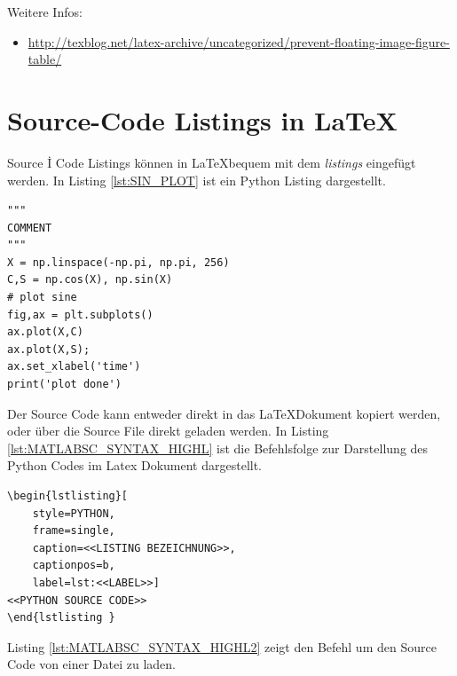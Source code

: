 \documentclass[SSS_Laborbericht.tex]{subfiles}
\begin{document}
Weitere Infos:
\begin{itemize}
  \item \href{http://texblog.net/latex-archive/uncategorized/prevent-floating-image-figure-table/}{http://texblog.net/latex-archive/uncategorized/prevent-floating-image-figure-table/}
\end{itemize}

\section{Source-Code Listings in \LaTeX}
Source \.I Code Listings können in \LaTeX bequem mit dem \textit{listings} eingefügt werden. In Listing \ref{lst:SIN_PLOT} ist ein Python Listing dargestellt.
\begin{lstlisting}[style=PYTHON, frame=single, caption=Sinus Plot, captionpos=b, label=lst:SIN_PLOT]
"""
COMMENT
"""
X = np.linspace(-np.pi, np.pi, 256)
C,S = np.cos(X), np.sin(X)
# plot sine
fig,ax = plt.subplots()
ax.plot(X,C)
ax.plot(X,S);
ax.set_xlabel('time')
print('plot done')
\end{lstlisting}
Der Source Code kann entweder direkt in das \LaTeX Dokument kopiert werden, oder über die Source File direkt geladen werden. In Listing \ref{lst:MATLABSC_SYNTAX_HIGHL} ist die Befehlsfolge zur Darstellung des Python Codes im Latex Dokument dargestellt. 
\begin{lstlisting}[style=LATEX, frame=single, caption=Latex Source Code Syntax Highlighting Prototyp, captionpos=b, label=lst:MATLABSC_SYNTAX_HIGHL, numbers=none]
\begin{lstlisting}[
	style=PYTHON,
	frame=single, 
	caption=<<LISTING BEZEICHNUNG>>, 
	captionpos=b, 
	label=lst:<<LABEL>>]
<<PYTHON SOURCE CODE>>
\end{lstlisting }
\end{lstlisting}

\newpage
Listing \ref{lst:MATLABSC_SYNTAX_HIGHL2} zeigt den Befehl um den Source Code von einer Datei zu laden.
\begin{lstlisting}[style=LATEX, frame=single, caption=Source Code in Latex Dokument, captionpos=b, label=lst:MATLABSC_SYNTAX_HIGHL2, numbers=none]

\end{lstlisting}


%
%

\end{document}
